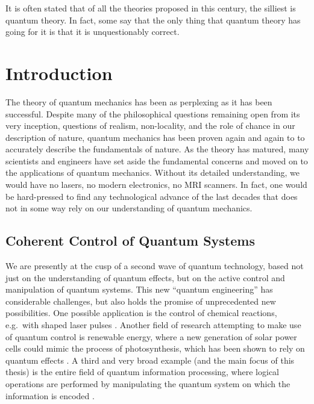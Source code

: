 \begin{savequote}[75mm]
It is often stated that of all the theories proposed in this century, the
silliest is quantum theory. In fact, some say that the only thing that quantum
theory has going for it is that it is unquestionably correct.
\end{savequote}

\chapter{Introduction}
\label{chap:introduction}

The theory of quantum mechanics has been as perplexing as it has been
successful. Despite many of the philosophical questions remaining open from its
very inception, questions of realism, non-locality, and the role of chance in
our description of nature, quantum mechanics has been proven again and again to
to accurately describe the fundamentals of nature. As the theory has matured,
many scientists and engineers have set aside the fundamental concerns and moved
on to the applications of quantum mechanics. Without its detailed understanding,
we would have no lasers, no modern electronics, no MRI scanners. In fact, one
would be hard-pressed to find any technological advance of the last decades that
does not in some way rely on our understanding of quantum mechanics.

\section{Coherent Control of Quantum Systems}

We are presently at the cusp of a second wave of quantum technology, based not
just on the understanding of quantum effects, but on the active control and
manipulation of quantum systems. This new ``quantum engineering'' has
considerable challenges, but also holds the promise of unprecedented new
possibilities. One possible application is the control of chemical
reactions, e.g.\ with shaped laser pulses \cite{BrumerShapiro}.
Another field of research attempting to make use of quantum control is renewable
energy, where a new generation of solar power cells could mimic the process of
photosynthesis, which has been shown to rely on quantum effects
\cite{ColliniScience09, SarovarNatPhys10}.  A third and very broad example (and
the main focus of this thesis) is the entire field of quantum information
processing, where logical operations are performed by manipulating the quantum
system on which the information is encoded \cite{NielsenChuang}.

